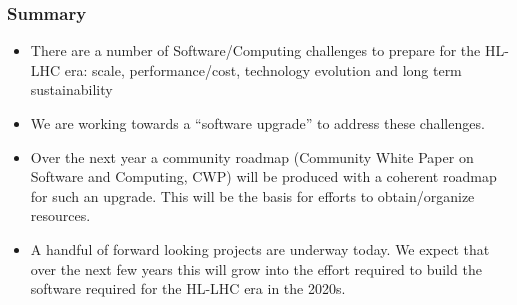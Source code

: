 \begin{frame}
\frametitle{Summary}

\begin{itemize}
\item There are a number of Software/Computing challenges to prepare for the HL-LHC era: scale, performance/cost, technology evolution and long term sustainability
\item We are working towards a ``software upgrade'' to address these challenges.
\item Over the next year a community roadmap (Community White Paper on Software and Computing, CWP) will be produced with a coherent roadmap for such an upgrade. This will be the basis for efforts to obtain/organize resources.
\item A handful of forward looking projects are underway today. We expect that over the next few years this will grow into the effort required to build the software required for the HL-LHC era in the 2020s.
\end{itemize}



\end{frame}


